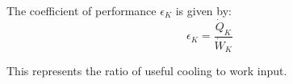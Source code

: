 The coefficient of performance \( \epsilon_K \) is given by:  
\[
\epsilon_K = \frac{\dot{Q}_K}{\dot{W}_K}
\]  

This represents the ratio of useful cooling to work input.